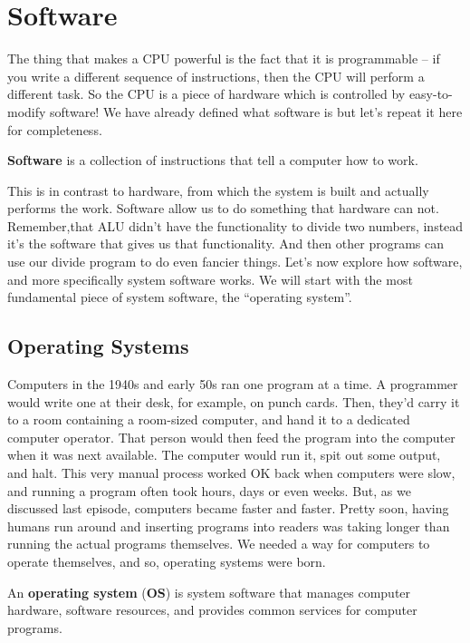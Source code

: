 
\section{Software}

The thing that makes a CPU powerful is the fact that it is programmable – if you write a different sequence of
instructions, then the CPU will perform a different task. So the CPU is a piece of hardware which is controlled by
easy-to-modify software! We have already defined what software is but let's repeat it here for completeness.

\bd[Software]
\textbf{Software} is a collection of instructions that tell a computer how to work.
\ed

This is in contrast to hardware, from which the system is built and actually performs the work. Software allow us to
do something that hardware can not. Remember,that ALU didn't have the functionality to divide two numbers, instead
it's the software that gives us that functionality. And then other programs can use our divide program to do even
fancier things. \v

Let's now explore how software, and more specifically system software works. We will start with the most fundamental
piece of system software, the ``operating system''.

\subsection{Operating Systems}

Computers in the 1940s and early 50s ran one program at a time. A programmer would write one at their desk, for
example, on punch cards. Then, they'd carry it to a room containing a room-sized computer, and hand it to a dedicated
computer operator. That person would then feed the program into the computer when it was next available. The computer
would run it, spit out some output, and halt. This very manual process worked OK back when computers were slow, and
running a program often took hours, days or even weeks. But, as we discussed last episode, computers became faster
and faster. Pretty soon, having humans run around and inserting programs into readers was taking longer than running
the actual programs themselves. We needed a way for computers to operate themselves, and so, operating systems were
born.

An \textbf{operating system} (\textbf{OS}) is system software that manages computer hardware, software resources, and
provides common services for computer programs.
\ed

